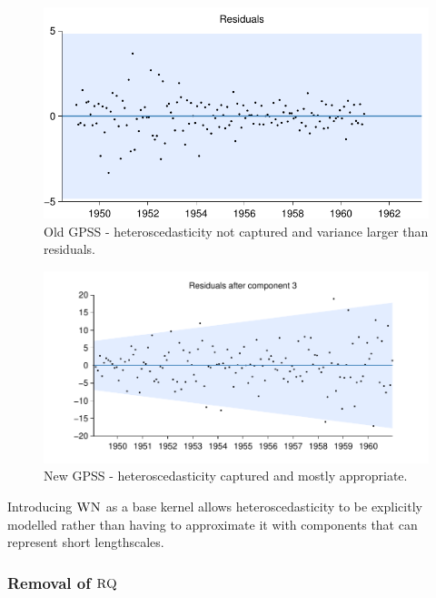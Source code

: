 \documentclass{article}
\begin{document}
\begin{figure}[h]
\centering
\includegraphics[width=0.98\columnwidth]{figures/old-gpss/01-airline-months_resid}
\caption{Old GPSS - heteroscedasticity not captured and variance larger than residuals.}
\label{fig:not_hetero}
\end{figure}

\begin{figure}[h]
\centering
\includegraphics[width=0.98\columnwidth]{figures/01-airline/01-airline_3_anti_cum}
\caption{New GPSS - heteroscedasticity captured and mostly appropriate.}
\label{fig:hetero}
\end{figure}

Introducing ${\textsc{WN}}$ as a base kernel allows heteroscedasticity to be explicitly modelled rather than having to approximate it with components that can represent short lengthscales.




\subsubsection{Removal of ${\textsc{RQ}}$}
\end{document}
